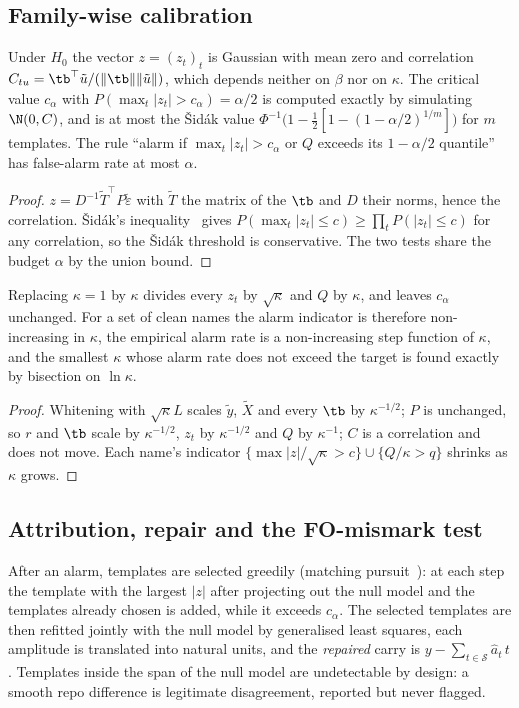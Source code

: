 \subsection{Family-wise calibration}
\begin{proposition}\label{prop-family}
Under $H_0$ the vector $z=(z_t)_t$ is Gaussian with mean zero and correlation $C_{tu}=\tb^\top\tilde u/(\|\tb\|\|\tilde u\|)$,
which depends neither on $\beta$ nor on $\kappa$. The critical value $c_\alpha$ with $P(\max_t|z_t|>c_\alpha)=\alpha/2$ is
computed exactly by simulating $\N(0,C)$, and is at most the Šidák value
$\Phi^{-1}\bigl(1-\tfrac12[1-(1-\alpha/2)^{1/m}]\bigr)$ for $m$ templates. The rule ``alarm if $\max_t|z_t|>c_\alpha$ or $Q$
exceeds its $1-\alpha/2$ quantile'' has false-alarm rate at most $\alpha$.
\end{proposition}
\begin{proof}
$z=D^{-1}\tilde T^\top P\tilde\varepsilon$ with $\tilde T$ the matrix of the $\tb$ and $D$ their norms, hence the
correlation. Šidák's inequality~\cite{sidak1967} gives $P(\max_t|z_t|\le c)\ge\prod_tP(|z_t|\le c)$ for any
correlation, so the Šidák threshold is conservative. The two tests share the budget $\alpha$ by the union bound.
\end{proof}

\begin{proposition}\label{prop-kappa}
Replacing $\kappa=1$ by $\kappa$ divides every $z_t$ by $\sqrt\kappa$ and $Q$ by $\kappa$, and leaves $c_\alpha$
unchanged. For a set of clean names the alarm indicator is therefore non-increasing in $\kappa$, the empirical alarm
rate is a non-increasing step function of $\kappa$, and the smallest $\kappa$ whose alarm rate does not exceed the
target is found exactly by bisection on $\ln\kappa$.
\end{proposition}
\begin{proof}
Whitening with $\sqrt\kappa L$ scales $\tilde y$, $\tilde X$ and every $\tb$ by $\kappa^{-1/2}$; $P$ is unchanged, so $r$ and
$\tb$ scale by $\kappa^{-1/2}$, $z_t$ by $\kappa^{-1/2}$ and $Q$ by $\kappa^{-1}$; $C$ is a correlation and does not move.
Each name's indicator $\{\max|z|/\sqrt\kappa>c\}\cup\{Q/\kappa>q\}$ shrinks as $\kappa$ grows.
\end{proof}

\subsection{Attribution, repair and the FO-mismark test}
After an alarm, templates are selected greedily (matching pursuit~\cite{mallat1993}): at each step the template with the
largest $|z|$ after projecting out the null model and the templates already chosen is added, while it exceeds
$c_\alpha$. The selected templates are then refitted jointly with the null model by generalised least squares, each
amplitude is translated into natural units, and the \emph{repaired} carry is $y-\sum_{t\in\mathcal S}\hat a_t\,t$.
Templates inside the span of the null model are undetectable by design: a smooth repo difference is legitimate
disagreement, reported but never flagged.

